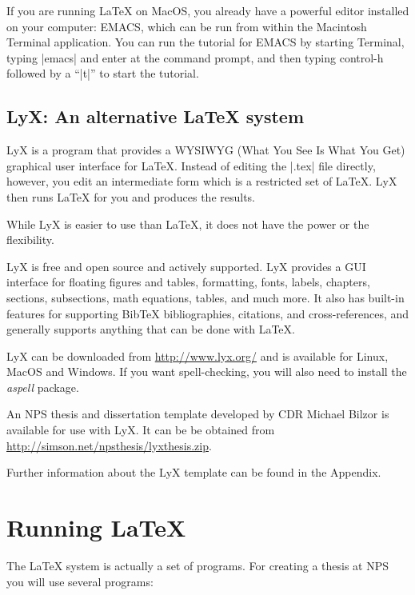 If you are running \LaTeX{} on MacOS, you already have a powerful editor
installed on your computer: EMACS, which can be run from within the
Macintosh Terminal application. You can run the tutorial for EMACS by
starting Terminal, typing |emacs| and enter at the command prompt, and
then typing control-h followed by a ``|t|'' to start the tutorial.

\subsection{LyX: An alternative \LaTeX{} system}

LyX is a program that provides a WYSIWYG (What You See Is What
  You Get) graphical user interface for \LaTeX. Instead of editing the
|.tex| file directly, however, you edit an intermediate form which is
a restricted set of \LaTeX. LyX then runs \LaTeX{} for you and
produces the results.

While LyX is easier to use than \LaTeX, it does not have the power or
the flexibility.

LyX is free and open source and actively supported. LyX provides a GUI interface for floating figures and tables,
formatting, fonts, labels, chapters, sections, subsections, math
equations, tables, and much more.  It also has built-in features for
supporting Bib\TeX{} bibliographies, citations, and cross-references,
and generally supports anything that can be done with \LaTeX{}.

LyX can be downloaded from  \url{http://www.lyx.org/} and is available
for Linux, MacOS and Windows.  If you want spell-checking, you will
also need to install the \emph{aspell} package. 

An NPS thesis and dissertation template developed by CDR Michael
Bilzor is available for use with LyX. It can be be obtained from
\url{http://simson.net/npsthesis/lyxthesis.zip}.  

Further information about the LyX template can be found in the Appendix.


\section{Running \LaTeX}\label{runninglatex}
The \LaTeX{} system is actually a set of programs. For creating a thesis at NPS you will use several programs:

